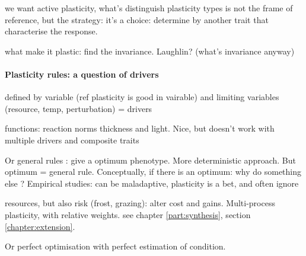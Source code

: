 




we want active plasticity, what's distinguish plasticity types is not the frame of reference, but the strategy: it's a choice: determine by another trait that characterise the response.

what make it plastic: find the invariance. Laughlin? (what's invariance anyway)

\paragraph{Plasticity rules: a question of drivers}

defined by variable (ref plasticity is good in vairable) and limiting variables (resource, temp, perturbation) = drivers

functions: reaction norms \parencite{feller_mathematical_2015} thickness and light. Nice, but doesn't work with multiple drivers and composite traits

Or general rules : give a optimum phenotype. More deterministic approach. But optimum = general rule. Conceptually, if there is an optimum: why do something else ? Empirical studies: can be maladaptive, plasticity is a bet, and often ignore 

resources, but also risk (frost, grazing): alter cost and gains. Multi-process plasticity, with relative weights. see chapter \ref{part:synthesis}, section \ref{chapter:extension}.


Or perfect optimisation with perfect estimation of condition.





